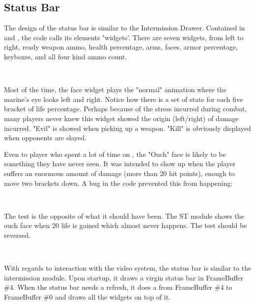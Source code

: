 \subsection{Status Bar}
The design of the status bar is similar to the Intermission Drawer. Contained in  and , the code calls its elements "widgets'. There are seven widgets, from left to right, ready weapon ammo, health percentage, arms, faces, armor percentage, keyboxes, and all four kind ammo count.\\
\par
{}
\par

\par
{}\\
\par
Most of the time, the face widget plays the "normal" animation where the marine's eye looks left and right. Notice how there is a set of state for each five bracket of life percentage. Perhaps because of the stress incurred during combat, many players never knew this widget showed the origin (left/right) of damage incurred. "Evil" is showed when picking up a weapon. "Kill" is obviously displayed when opponents are slayed.\\
\par
Even to player who spent a lot of time on \doom, the "Ouch" face is likely to be something they have never seen. It was intended to show up when the player suffers an enormous amount of damage (more than 20 hit points), enough to move two brackets down. A bug in the code prevented this from happening:\\
\par
{}\\
\par
The test is the opposite of what it should have been. The ST module shows the ouch face when 20 life is gained which almost never happens. The test should be reversed.\\
\par
{}\\
\par
With regards to interaction with the video system, the status bar is similar to the intermission module. Upon startup, it draws a virgin status bar in FrameBuffer \#4. When the status bar needs a refresh, it does a  from FrameBuffer \#4 to FrameBuffer \#0 and draws all the widgets on top of it.\\
\par
{}


